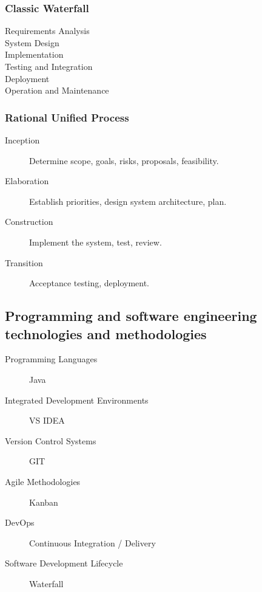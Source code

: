 \documentclass[11pt,journal,compsoc]{IEEEtran}
\begin{document}
\subsubsection{Classic Waterfall}

\begin{description}
    \item[Requirements Analysis] 

    \item[System Design] 

    \item[Implementation] 

    \item[Testing and Integration] 

    \item[Deployment] 

    \item[Operation and Maintenance] 
\end{description}


\subsubsection{Rational Unified Process}

\begin{description}
    \item[Inception] Determine scope, goals, risks, proposals, feasibility.

    \item[Elaboration] Establish priorities, design system architecture, plan.

    \item[Construction] Implement the system, test, review.

    \item[Transition] Acceptance testing, deployment.
\end{description}


\subsection{Programming and software engineering technologies and methodologies}

\begin{description}
    \item[Programming Languages] Java
    
    \item[Integrated Development Environments] VS IDEA

    \item[Version Control Systems] GIT

    \item[Agile Methodologies] Kanban

    \item[DevOps] Continuous Integration / Delivery

    \item[Software Development Lifecycle] Waterfall
\end{description}
\end{document}
